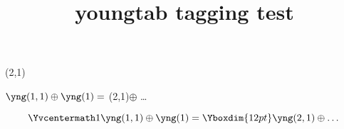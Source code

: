 \documentclass{article}
\title{youngtab tagging test}
\begin{document}
\yng(2,1)

 $\yng(1,1)\oplus\yng(1)=$
\yng(2,1)$\oplus$ \dots

\begin{equation}
\Yvcentermath1
\yng(1,1)\oplus\yng(1)= \Yboxdim{12pt}
\yng(2,1)\oplus\dots
\end{equation}
\end{document}

